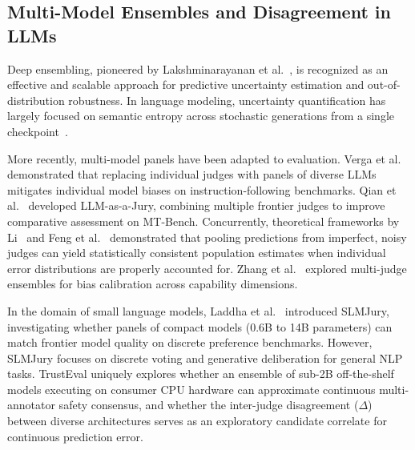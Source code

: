\subsection{Multi-Model Ensembles and Disagreement in LLMs}
\label{sec:rel_ensembles}

Deep ensembling, pioneered by Lakshminarayanan et al.~\cite{lakshminarayanan2017simple}, is recognized as an effective and scalable approach for predictive uncertainty estimation and out-of-distribution robustness. In language modeling, uncertainty quantification has largely focused on semantic entropy across stochastic generations from a single checkpoint~\cite{kuhn2023semantic,malinin2018predictive}.

More recently, multi-model panels have been adapted to evaluation. Verga et al.~\cite{verga2024replacing} demonstrated that replacing individual judges with panels of diverse LLMs mitigates individual model biases on instruction-following benchmarks. Qian et al.~\cite{qian2026who} developed LLM-as-a-Jury, combining multiple frontier judges to improve comparative assessment on MT-Bench. Concurrently, theoretical frameworks by Li~\cite{li2026calibrate} and Feng et al.~\cite{feng2026noisy} demonstrated that pooling predictions from imperfect, noisy judges can yield statistically consistent population estimates when individual error distributions are properly accounted for. Zhang et al.~\cite{zhang2026can} explored multi-judge ensembles for bias calibration across capability dimensions.

In the domain of small language models, Laddha et al.~\cite{laddha2026slmjury} introduced SLMJury, investigating whether panels of compact models (0.6B to 14B parameters) can match frontier model quality on discrete preference benchmarks. However, SLMJury focuses on discrete voting and generative deliberation for general NLP tasks. TrustEval uniquely explores whether an ensemble of sub-2B off-the-shelf models executing on consumer CPU hardware can approximate continuous multi-annotator safety consensus, and whether the inter-judge disagreement ($\Delta$) between diverse architectures serves as an exploratory candidate correlate for continuous prediction error.


